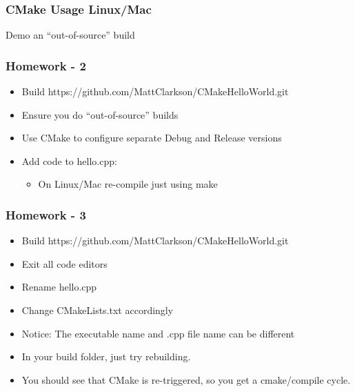 \subsubsection{CMake Usage Linux/Mac}\label{cmake-usage-linuxmac}

Demo an ``out-of-source'' build

\begin{Shaded}
\begin{Highlighting}[]
 
 
 
 
 
 
 
\end{Highlighting}
\end{Shaded}

\subsubsection{Homework - 2}\label{homework---2}

\begin{itemize}
\itemsep1pt\parskip0pt
\item
  Build https://github.com/MattClarkson/CMakeHelloWorld.git
\item
  Ensure you do ``out-of-source'' builds
\item
  Use CMake to configure separate Debug and Release versions
\item
  Add code to hello.cpp:

  \begin{itemize}
  \itemsep1pt\parskip0pt
  \item
    On Linux/Mac re-compile just using make
  \end{itemize}
\end{itemize}

\subsubsection{Homework - 3}\label{homework---3}

\begin{itemize}
\itemsep1pt\parskip0pt
\item
  Build https://github.com/MattClarkson/CMakeHelloWorld.git
\item
  Exit all code editors
\item
  Rename hello.cpp
\item
  Change CMakeLists.txt accordingly
\item
  Notice: The executable name and .cpp file name can be different
\item
  In your build folder, just try rebuilding.
\item
  You should see that CMake is re-triggered, so you get a cmake/compile
  cycle.
\end{itemize}


